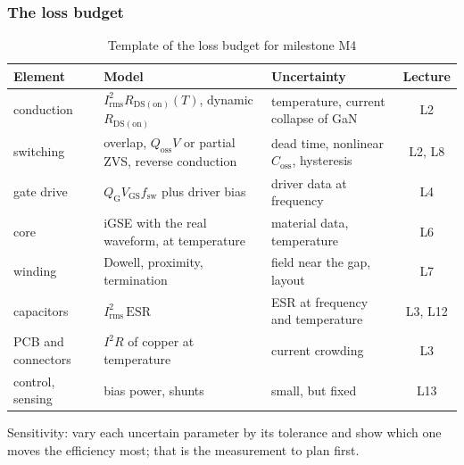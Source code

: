 \begin{frame}
	\frametitle{The loss budget}
	\begin{table}
		\centering
		\scriptsize
		\begin{tabular}{|l|>{\raggedright\arraybackslash}p{5.2cm}|>{\raggedright\arraybackslash}p{4.6cm}|c|}
			\hline
			\textbf{Element}     & \textbf{Model}                                                        & \textbf{Uncertainty}                              & \textbf{Lecture} \\
			\hline
			conduction           & $I_\mathrm{rms}^2R_\mathrm{DS(on)}(T)$, dynamic $R_\mathrm{DS(on)}$    & temperature, current collapse of GaN              & L2               \\
			switching            & overlap, $Q_\mathrm{oss}V$ or partial ZVS, reverse conduction         & dead time, nonlinear $C_\mathrm{oss}$, hysteresis & L2, L8           \\
			gate drive           & $Q_\mathrm{G}V_\mathrm{GS}f_\mathrm{sw}$ plus driver bias             & driver data at frequency                          & L4               \\
			core                 & iGSE with the real waveform, at temperature                           & material data, temperature                        & L6               \\
			winding              & Dowell, proximity, termination                                        & field near the gap, layout                        & L7               \\
			capacitors           & $I_\mathrm{rms}^2\,\mathrm{ESR}$                                      & ESR at frequency and temperature                  & L3, L12          \\
			PCB and connectors   & $I^2R$ of copper at temperature                                       & current crowding                                  & L3               \\
			control, sensing     & bias power, shunts                                                    & small, but fixed                                  & L13              \\
			\hline
		\end{tabular}
		\caption{Template of the loss budget for milestone M4}
	\end{table}
	\small
	Sensitivity: vary each uncertain parameter by its tolerance and show which one moves the efficiency most; that is the measurement to plan first.
\end{frame}

